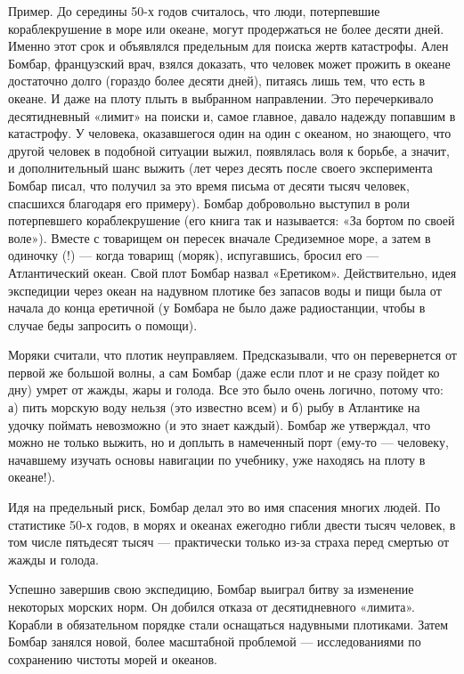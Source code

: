 Пример.  До  середины  50-х  годов считалось,  что  люди,  потерпевшие
кораблекрушение в море или океане,  могут продержаться не более десяти
дней.  Именно  этот срок  и  объявлялся  предельным для  поиска  жертв
катастрофы.  Ален  Бомбар,  французский  врач,  взялся  доказать,  что
человек может прожить в океане  достаточно долго (гораздо более десяти
дней), питаясь лишь  тем, что есть в  океане. И даже на  плоту плыть в
выбранном  направлении.  Это  перечеркивало десятидневный  «лимит»  на
поиски  и, самое  главное,  давало надежду  попавшим  в катастрофу.  У
человека,  оказавшегося  один на  один  с  океаном, но  знающего,  что
другой человек  в подобной ситуации  выжил, появлялась воля  к борьбе,
а  значит,  и  дополнительный  шанс выжить  (лет  через  десять  после
своего  эксперимента Бомбар  писал, что  получил за  это время  письма
от  десяти тысяч  человек,  спасшихся благодаря  его примеру).  Бомбар
добровольно выступил  в роли  потерпевшего кораблекрушение  (его книга
так и  называется: «За бортом по  своей воле»). Вместе с  товарищем он
пересек  вначале Средиземное  море, а  затем  в одиночку  (!) —  когда
товарищ (моряк),  испугавшись, бросил его —  Атлантический океан. Свой
плот Бомбар  назвал «Еретиком».  Действительно, идея  экспедиции через
океан на  надувном плотике без запасов  воды и пищи была  от начала до
конца еретичной (у  Бомбара не было даже радиостанции,  чтобы в случае
беды запросить о помощи).

Моряки  считали,   что  плотик  неуправляем.  Предсказывали,   что  он
перевернется от первой же большой волны,  а сам Бомбар (даже если плот
и не сразу пойдет ко дну) умрет  от жажды, жары и голода. Все это было
очень логично, потому  что: а) пить морскую воду  нельзя (это известно
всем) и б) рыбу в Атлантике  на удочку поймать невозможно (и это знает
каждый). Бомбар же утверждал, что можно не только выжить, но и доплыть
в  намеченный  порт  (ему-то  —  человеку,  начавшему  изучать  основы
навигации по учебнику, уже находясь на плоту в океане!).

Идя на предельный риск, Бомбар делал это во имя спасения многих людей.
По  статистике 50-х  годов, в  морях и  океанах ежегодно  гибли двести
тысяч человек, в том числе  пятьдесят тысяч — практически только из-за
страха перед смертью от жажды и голода.

Успешно завершив  свою экспедицию,  Бомбар выиграл битву  за изменение
некоторых   морских  норм.   Он  добился   отказа  от   десятидневного
«лимита». Корабли  в обязательном  порядке стали  оснащаться надувными
плотиками. Затем  Бомбар занялся  новой, более масштабной  проблемой —
исследованиями по сохранению чистоты морей и океанов.






